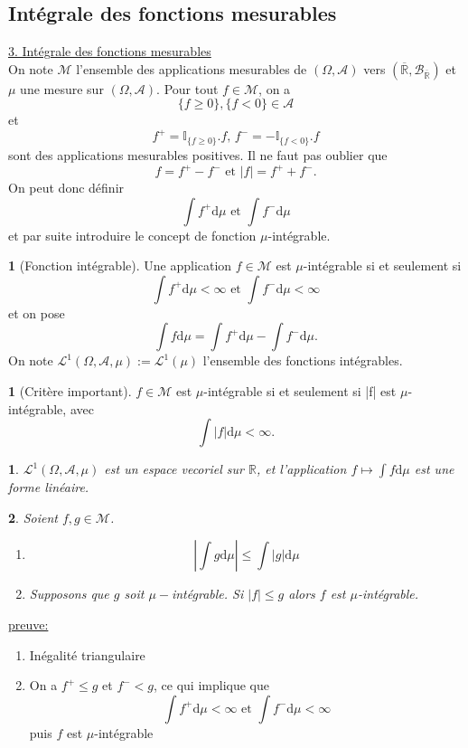 \documentclass[8pt,notheorems]{beamer}
\def \R{\mathbb{R}}
\newtheorem{prop}{\translate{Proposition}}
\theoremstyle{definition}
\newtheorem{definition}{\translate{Definition}}
\theoremstyle{example}
\newtheorem{remark}{\translate{Remarque}}
\theoremstyle{mystyle}
\theoremstyle{plain}
\begin{document}
\subsection{Intégrale des fonctions mesurables}
\begin{frame}[allowframebreaks]
\underline{3. Intégrale des fonctions mesurables}\\
On note $\mathcal{M}$ l'ensemble des applications mesurables de $(\Omega, \mathcal{A})$ vers $(\overline{\R}, \mathcal{B}_{\overline{\R}})$ et $\mu$ une mesure sur $(\Omega, \mathcal{A})$. Pour tout $f\in \mathcal{M}$, on a 
$$
\{f\geq 0\},\{f< 0\}\in \mathcal{A}
$$ 
et 
$$
f^+ = \mathbb{I}_{\{f\geq 0\}}.f\text{, }f^- = -\mathbb{I}_{\{f< 0\}}.f
$$
sont des applications mesurables positives. Il ne faut pas oublier que 
$$
f = f^+ - f^-\text{ et }|f| = f^+ + f^-.
$$
On peut donc définir 
$$
\int f^+\text{d}\mu\text{ et }\int f^-\text{d}\mu
$$
et par suite introduire le concept de fonction $\mu$-intégrable.  
\begin{definition}[Fonction intégrable]
Une application $f\in \mathcal{M}$ est $\mu$-intégrable si et seulement si 
$$
\int f^{+}\text{d}\mu<\infty\text{ et }\int f^{-}\text{d}\mu<\infty
$$
et on pose
$$
\int f\text{d}\mu=\int f^{+}\text{d}\mu-\int f^{-}\text{d}\mu.
$$
On note $\mathcal{L}^{1}(\Omega, \mathcal{A},\mu) := \mathcal{L}^{1}(\mu) $ l'ensemble des fonctions intégrables.
\end{definition}
\begin{remark}[Critère important]
$f\in \mathcal{M}$ est $\mu$-intégrable si et seulement si |f| est $\mu$-intégrable, avec 
$$
\int |f|\text{d}\mu < \infty.
$$
\end{remark}
\begin{prop}
$\mathcal{L}^{1}(\Omega, \mathcal{A},\mu)$ est un espace vecoriel sur $\R$, et l'application $f\mapsto\int f\text{d}\mu$ est une forme linéaire.
\end{prop}
\begin{prop}
Soient $f,g\in \mathcal{M}$.  
\begin{enumerate}
    \item 
    $$
    \left|\int g\text{d}\mu\right|\leq \int |g|\text{d}\mu 
    $$
    \item Supposons que $g$ soit $\mu-$intégrable. Si $|f|\leq g$ alors $f$ est $\mu$-intégrable.
\end{enumerate}
\end{prop}
\underline{preuve:}\\
\begin{enumerate}
    \item Inégalité triangulaire 
    \item On a $f^+\leq g$ et $f^-< g$, ce qui implique que  
    $$
    \int f^+\text{d}\mu<\infty\text{ et }\int f^-\text{d}\mu<\infty
    $$
    puis $f$ est $\mu$-intégrable 
\end{enumerate}
\end{frame}
\end{document}
